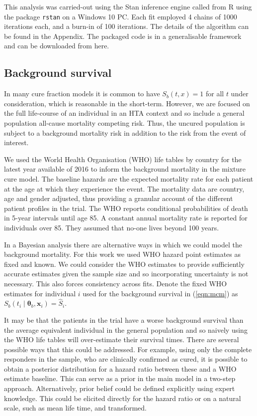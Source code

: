 \documentclass[AMA,STIX1COL]{WileyNJD-v2}
\begin{document}
This analysis was carried-out using the Stan inference engine \cite{carpenter2017stan} called from R \cite{Rcoreteam} using the package \texttt{rstan} on a Windows 10 PC.
Each fit employed 4 chains of 1000 iterations each, and a burn-in of 100 iterations.
The details of the algorithm can be found in the Appendix.
The packaged code is in a generalisable framework and can be downloaded from here.

%
\subsection{Background survival}
In many cure fraction models it is common to have $S_b(t, x) = 1$ for all $t$ under consideration, which is reasonable in the short-term.
However, we are focused on the full life-course of an individual in an HTA context and so include a general population all-cause mortality competing risk.
Thus, the uncured population is subject to a background mortality risk in addition to the risk from the event of interest.

We used the World Health Organisation (WHO) life tables by country for the latest year available of 2016
\cite{wholifetables} to inform the background mortality in the mixture cure model.
The baseline hazards are the expected mortality rate for each patient at the age at which they experience the event.
The mortality data are country, age and gender adjusted, thus providing a granular account of
the different patient profiles in the trial.
The WHO reports conditional probabilities of death in 5-year intervals until age 85.
A constant annual mortality rate is reported for individuals over 85. They assumed that no-one lives beyond 100 years.

In a Bayesian analysis there are alternative ways in which we could model the background mortality.
For this work we used WHO hazard point estimates as fixed and known.
We could consider the WHO estimates to provide sufficiently accurate estimates
given the sample size and so incorporating uncertainty is not necessary. This also forces consistency across fits.
Denote the fixed WHO estimates for individual $i$ used for the background survival in (\ref{eqn:mcm}) as
$S_b(t_i \mid \bm\theta_b, \bm{x}_i) = \hat{S}_i$.

It may be that the patients in the trial have a worse background survival than the average equivalent individual in the general population and so naively using the WHO life tables will over-estimate their survival times.
There are several possible ways that this could be addressed.
For example, using only the complete responders in the sample, who are clinically confirmed as cured, it is possible to obtain a posterior distribution for a hazard ratio between these and a WHO estimate baseline.
This can serve as a prior in the main model in a two-step approach. Alternatively, prior belief could be defined explicitly using expert knowledge.
This could be elicited directly for the hazard ratio or on a natural scale, such as mean life time, and transformed.
\end{document}
